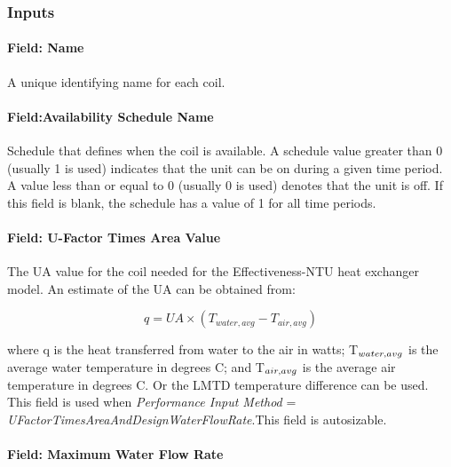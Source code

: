 \subsubsection{Inputs}\label{inputs-1-020}

\paragraph{Field: Name}\label{field-name-1-019}

A unique identifying name for each coil.

\paragraph{Field:Availability Schedule Name}\label{fieldavailability-schedule-name-1-000}

Schedule that defines when the coil is available. A schedule value greater than 0 (usually 1 is used) indicates that the unit can be on during a given time period. A value less than or equal to 0 (usually 0 is used) denotes that the unit is off. If this field is blank, the schedule has a value of 1 for all time periods.

\paragraph{Field: U-Factor Times Area Value}\label{field-u-factor-times-area-value}

The UA value for the coil needed for the Effectiveness-NTU heat exchanger model. An estimate of the UA can be obtained from:

\begin{equation}
q = UA \times ({T_{water,avg}} - {T_{air,avg}})
\end{equation}

where q is the heat transferred from water to the air in watts; T\(_{water,\\ avg}\) is the average water temperature in degrees C; and T\(_{air,\\ avg}\) is the average air temperature in degrees C. Or the LMTD temperature difference can be used. This field is used when \emph{Performance Input Method} = \emph{UFactorTimesAreaAndDesignWaterFlowRate}.This field is autosizable.

\paragraph{Field: Maximum Water Flow Rate}\label{field-maximum-water-flow-rate-000}

